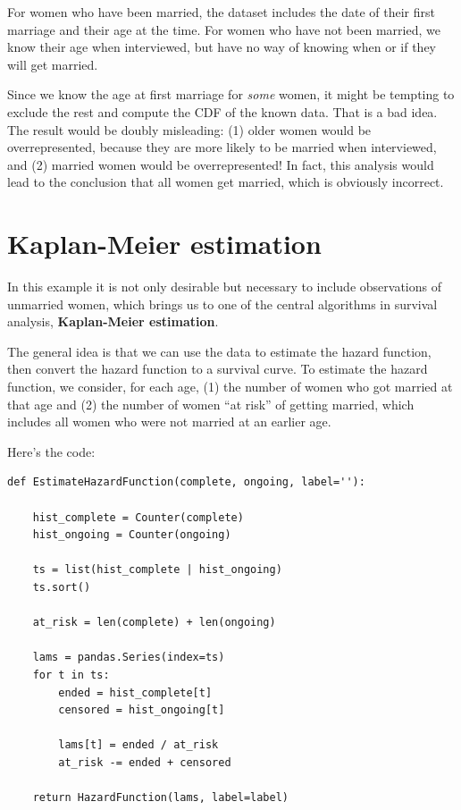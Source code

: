 \documentclass[12pt]{book}
\begin{document}
For women who have been married, the dataset includes the date
of their first marriage and their age at the time.
For women who have not been married, we know their age when interviewed,
but have no way of knowing when or if they will get married.

Since we know the age at first marriage for {\em some\/} women, it
might be tempting to exclude the rest and compute the CDF of
the known data.  That is a bad idea.  The result would
be doubly misleading: (1) older women would be overrepresented,
because they are more likely to be married when interviewed,
and (2) married women would be overrepresented!  In fact, this
analysis would lead to the conclusion that all women get married,
which is obviously incorrect.


\section{Kaplan-Meier estimation}

In this example it is not only desirable but necessary to include
observations of unmarried women, which brings us to one of the central
algorithms in survival analysis, {\bf Kaplan-Meier estimation}.

The general idea is that we can use the data to estimate the hazard
function, then convert the hazard function to a survival curve.
To estimate the hazard function, we consider, for each age,
(1) the number of women who got married at that age and (2) the number
of women ``at risk'' of getting married, which includes all women
who were not married at an earlier age.

Here's the code:

\begin{verbatim}
def EstimateHazardFunction(complete, ongoing, label=''):

    hist_complete = Counter(complete)
    hist_ongoing = Counter(ongoing)

    ts = list(hist_complete | hist_ongoing)
    ts.sort()

    at_risk = len(complete) + len(ongoing)

    lams = pandas.Series(index=ts)
    for t in ts:
        ended = hist_complete[t]
        censored = hist_ongoing[t]

        lams[t] = ended / at_risk
        at_risk -= ended + censored

    return HazardFunction(lams, label=label)
\end{verbatim}
\end{document}
